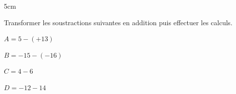 \documentclass[a4paper]{book}
\begin{document}
    \demonstration
    \begin{ZoneReponse}{5cm}\end{ZoneReponse}       

    
    \begin{exemple}
        Transformer les soustractions suivantes en addition puis effectuer les calculs.

        \medskip
        
        \begin{minipage}{0.24\linewidth}
            $A = 5 - (+13)$

            \vspace{2cm}
        \end{minipage}
        \hfill\vline\hfill
        \begin{minipage}{0.24\linewidth}
            $B = -15 - (-16)$

            \vspace{2cm}
        \end{minipage}
        \hfill\vline\hfill
        \begin{minipage}{0.24\linewidth}
            $C = 4 - 6$

            \vspace{2cm}
        \end{minipage}
        \hfill\vline\hfill
        \begin{minipage}{0.24\linewidth}
            $D= - 12 - 14$

            \vspace{2cm}
        \end{minipage}
    \end{exemple}
\end{document}
